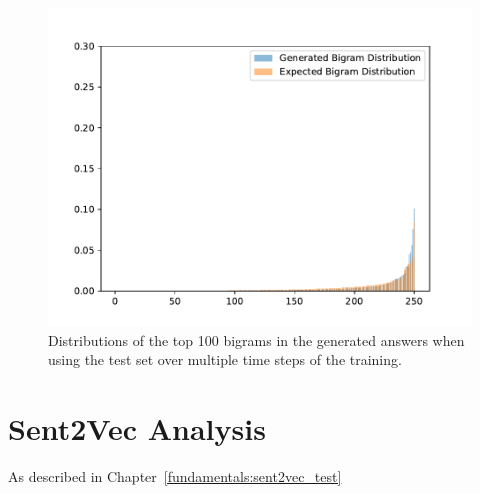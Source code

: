 \begin{figure}[H]
	\centering
	\small
	\endminipage\hfill
	\includegraphics[width=\linewidth]{img/plots/reddit/bigram_distribution_comparison_step_3000000.pdf}
	\centering
	\small
	\endminipage\hfill
	\caption{Distributions of the top 100 bigrams in the generated answers when using the test set over multiple time steps of the training.}
	\label{results:ngram:distributions:opensubtitles}
\end{figure}

\section{Sent2Vec Analysis}
As described in Chapter~\ref{fundamentals:sent2vec_test}

